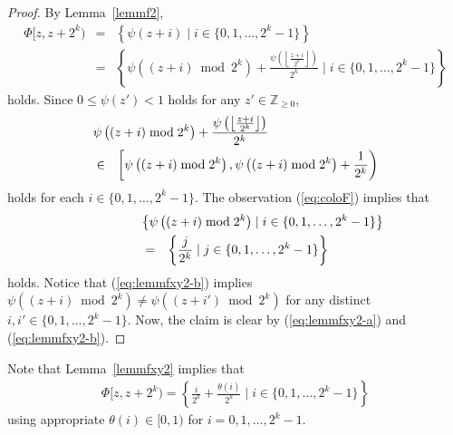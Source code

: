 \documentclass[letter, 11pt]{article}
\newcommand{\1}{\mbox{1}\hspace{-0.25em}\mbox{l}}
\begin{document}
\begin{proof}
 By Lemma~\ref{lemmf2}, 
\begin{eqnarray*}
\Phi[z, z+2^k) 
 &=& \left\{\psi(z+i) \mid i \in \{0,1,\ldots,2^k-1\} \right\}  \\
 &=& \left\{\psi\left((z+i) \bmod 2^k\right) +\frac{\psi\left(\left\lfloor \frac{z+i}{2^k} \right\rfloor\right)}{2^k}
  \mid i \in \{0,1,\ldots,2^k-1\} \right\}  
\end{eqnarray*}
  holds. 
 Since $0 \leq \psi(z') < 1$ holds for any $z' \in \mathbb{Z}_{\geq 0}$, 
\begin{eqnarray}
\lefteqn{\psi\left( (z + i) \bmod 2^k\right) + \frac{\psi\left( \left \lfloor \frac{z+i}{2^k}\right \rfloor \right)}{2^k}} \nonumber\\
&\in& \left[\psi\left( (z + i) \bmod 2^k\right),\psi\left( (z + i) \bmod 2^k\right) +\frac{1}{2^k} \right)
\label{eq:lemmfxy2-a}
\end{eqnarray}
  holds for each $i \in \{0,1,\ldots,2^k-1\}$. 
 The observation (\ref{eq:coloF}) implies that 
\begin{eqnarray}
\lefteqn{ \left \{ \psi\left( (z + i) \bmod 2^k\right) \mid i \in \{0,1,\ldots,2^k-1\} \right\}  } \nonumber\\
&=& 
 \left \{ \frac{j}{2^k} \mid j \in \{0,1,\ldots,2^k-1\} \right\}  
\label{eq:lemmfxy2-b}
\end{eqnarray}
  holds. 
 Notice that (\ref{eq:lemmfxy2-b}) implies 
$\psi\left( (z + i) \bmod 2^k\right) \neq \psi\left( (z + i') \bmod 2^k\right) $
for any distinct $i,i' \in  \{0,1,\ldots,2^k-1\} $. 
 Now, the claim is clear by (\ref{eq:lemmfxy2-a}) and (\ref{eq:lemmfxy2-b}). 
\end{proof}

 Note that Lemma~\ref{lemmfxy2} implies that \begin{eqnarray}
 \Phi [z, z+2^k) 
 = \left \{ \frac{i}{2^{k}} + \frac{\theta(i)}{2^{k}} \mid i \in \{0, 1, \ldots, 2^k-1 \} \right \}
\label{eq:FPSI-explicit}
\end{eqnarray}
  using appropriate $\theta(i) \in [0,1)$ for $i = 0,1,\ldots,2^k-1$. 
\end{document}
